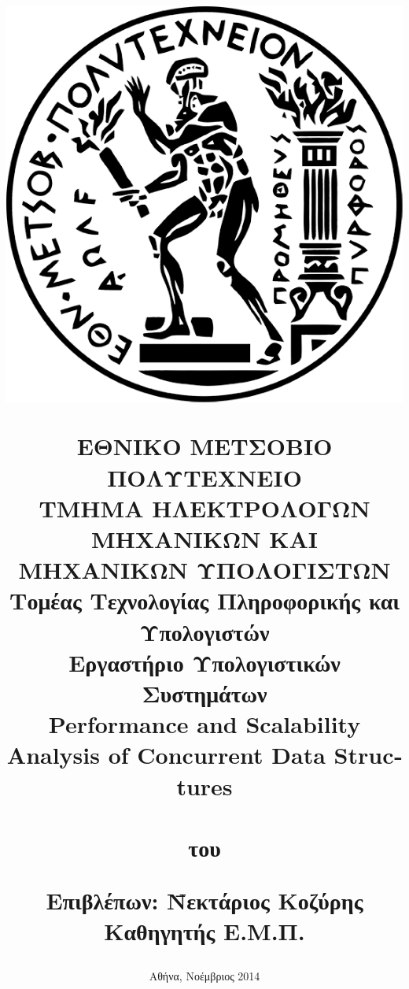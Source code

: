 \documentclass[12pt, twoside, a4paper]{report}
\begin{document}

\title{
\vspace{-6ex}
\begin{center}
\includegraphics[scale=0.1]{pyrforos.png}  %
\end{center}
\Large{Ε}\large{ΘΝΙΚΟ}
\Large{Μ}\large{ΕΤΣΟΒΙΟ}
\Large{Π}\large{ΟΛΥΤΕΧΝΕΙΟ} \\
\normalsize{Τ}\small{ΜΗΜΑ}
\normalsize{Η}\small{ΛΕΚΤΡΟΛΟΓΩΝ}
\normalsize{Μ}\small{ΗΧΑΝΙΚΩΝ}
\normalsize{Κ}\small{ΑΙ}
\normalsize{Μ}\small{ΗΧΑΝΙΚΩΝ}
\normalsize{Υ}\small{ΠΟΛΟΓΙΣΤΩΝ} \\
\vspace{2ex}
Τομέας Τεχνολογίας Πληροφορικής και Υπολογιστών \\
Εργαστήριο Υπολογιστικών Συστημάτων  \\
\vspace{8ex}
\large \textbf{\textlatin{Performance and Scalability Analysis of Concurrent Data Structures}} \\
\vspace{10ex}
\large
{} \\
\vspace{2ex}
\normalsize
του \\
\vspace{2ex}
\parbox[c]{0.4\textwidth} { \center\textbf{
\mbox{} }}
\vspace{10ex}
\flushleft
\begin{tabbing}
	\textbf{Επιβλέπων}: \= Νεκτάριος Κοζύρης \\
			    \> Καθηγητής Ε.Μ.Π.\\
\end{tabbing}
}
\date{
\normalsize
Αθήνα, Νοέμβριος 2014}
\end{document}
